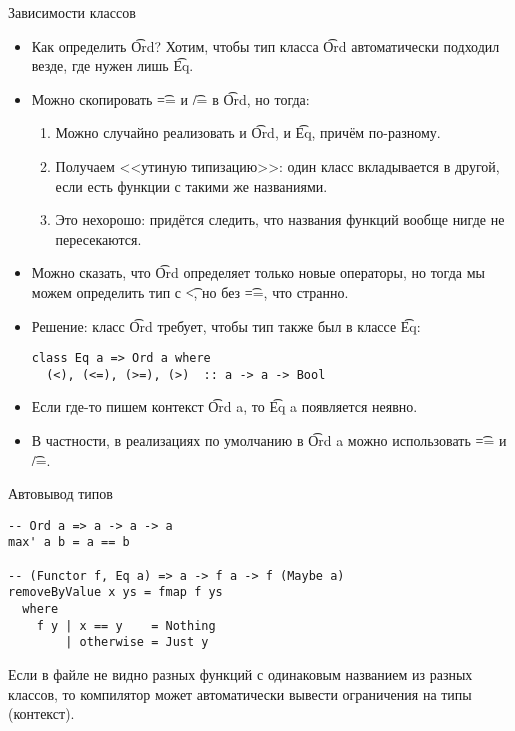 \begin{frame}[fragile]{Зависимости классов}
	\begin{itemize}
		\item Как определить \t{Ord}? Хотим, чтобы тип класса \t{Ord} автоматически подходил везде, где нужен лишь \t{Eq}.
		\item Можно скопировать \t{==} и \t{/=} в \t{Ord}, но тогда:
			\begin{enumerate}
				\item Можно случайно реализовать и \t{Ord}, и \t{Eq}, причём по-разному.
				\item Получаем <<утиную типизацию>>: один класс вкладывается в другой, если есть функции с такими же названиями.
				\item Это нехорошо: придётся следить, что названия функций вообще нигде не пересекаются.
			\end{enumerate}
		\item Можно сказать, что \t{Ord} определяет только новые операторы, но тогда мы можем определить тип с \t{<}, но без \t{==}, что странно.
		\item Решение: класс \t{Ord} требует, чтобы тип также был в классе \t{Eq}:
\begin{verbatim}
class Eq a => Ord a where
  (<), (<=), (>=), (>)  :: a -> a -> Bool
\end{verbatim}
		\item Если где-то пишем контекст \t{Ord a}, то \t{Eq a} появляется неявно.
		\item В частности, в реализациях по умолчанию в \t{Ord a} можно использовать \t{==} и \t{/=}.
	\end{itemize}
\end{frame}

\begin{frame}[fragile]{Автовывод типов}
\begin{verbatim}
-- Ord a => a -> a -> a
max' a b = a == b

-- (Functor f, Eq a) => a -> f a -> f (Maybe a)
removeByValue x ys = fmap f ys
  where
    f y | x == y    = Nothing
        | otherwise = Just y
\end{verbatim}
	Если в файле не видно разных функций с одинаковым названием из разных классов, то компилятор может автоматически вывести ограничения на типы (контекст).
\end{frame}

